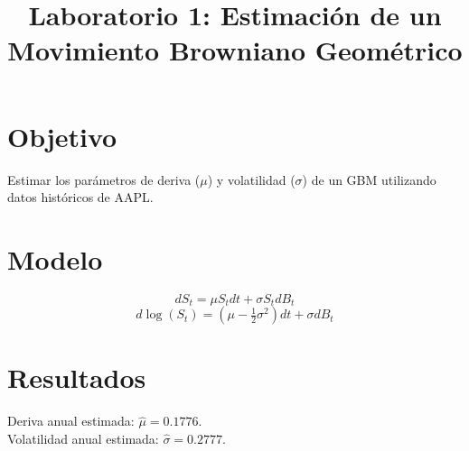 \documentclass[12pt]{article}
\begin{document}
\title{Laboratorio 1: Estimación de un Movimiento Browniano Geométrico}
\maketitle
\section{Objetivo}
Estimar los parámetros de deriva ($\mu$) y volatilidad ($\sigma$) de un GBM utilizando datos históricos de AAPL.
\section{Modelo}
\[ dS_t=\mu S_t dt+\sigma S_t dB_t \]
\[ d\log(S_t)=(\mu-\tfrac12\sigma^2)dt+\sigma dB_t \]
\section{Resultados}
Deriva anual estimada: $\hat{\mu}=0.1776$.\\
Volatilidad anual estimada: $\hat{\sigma}=0.2777$.
\end{document}
